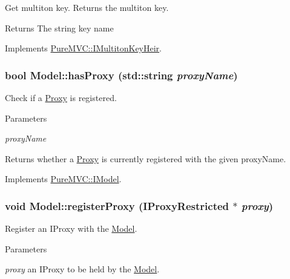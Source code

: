 Get multiton key. Returns the multiton key. \begin{DoxyReturn}{Returns}
The string key name 
\end{DoxyReturn}


Implements \hyperlink{class_pure_m_v_c_1_1_i_multiton_key_heir_aecccfb9898368c6377550ceae5730934}{PureMVC::IMultitonKeyHeir}.\hypertarget{class_pure_m_v_c_1_1_model_ae25df8e28fb2d4be29b8217211c7d965}{
\subsubsection[{hasProxy}]{\setlength{\rightskip}{0pt plus 5cm}bool Model::hasProxy (std::string {\em proxyName})}}
\label{class_pure_m_v_c_1_1_model_ae25df8e28fb2d4be29b8217211c7d965}


Check if a \hyperlink{class_pure_m_v_c_1_1_proxy}{Proxy} is registered. 
\begin{DoxyParams}{Parameters}
\item[{\em proxyName}]\end{DoxyParams}
\begin{DoxyReturn}{Returns}
whether a \hyperlink{class_pure_m_v_c_1_1_proxy}{Proxy} is currently registered with the given {\ttfamily proxyName}. 
\end{DoxyReturn}


Implements \hyperlink{class_pure_m_v_c_1_1_i_model_acb4d2a8493d547e597a3a3cfbbb7903b}{PureMVC::IModel}.\hypertarget{class_pure_m_v_c_1_1_model_a12d22c0faf6aa8c69d7b0e3d3cfdd13b}{
\subsubsection[{registerProxy}]{\setlength{\rightskip}{0pt plus 5cm}void Model::registerProxy ({\bf IProxyRestricted} $\ast$ {\em proxy})}}
\label{class_pure_m_v_c_1_1_model_a12d22c0faf6aa8c69d7b0e3d3cfdd13b}


Register an {\ttfamily IProxy} with the {\ttfamily \hyperlink{class_pure_m_v_c_1_1_model}{Model}}. 
\begin{DoxyParams}{Parameters}
\item[{\em proxy}]an {\ttfamily IProxy} to be held by the {\ttfamily \hyperlink{class_pure_m_v_c_1_1_model}{Model}}. \end{DoxyParams}


